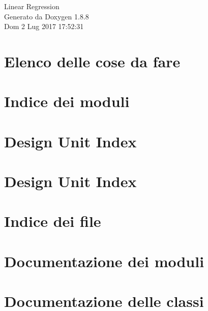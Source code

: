 \documentclass[twoside]{book}
\newcommand{\+}{\discretionary{\mbox{\scriptsize$\hookleftarrow$}}{}{}}
\newcommand{\clearemptydoublepage}{%
  \newpage{\pagestyle{empty}\cleardoublepage}%
}
\begin{document}
\hypersetup{pageanchor=false,
             bookmarks=true,
             bookmarksnumbered=true,
             pdfencoding=unicode
            }
\begin{titlepage}
\vspace*{7cm}
\begin{center}%
{\Large Linear Regression }\\
\vspace*{1cm}
{\large Generato da Doxygen 1.8.8}\\
\vspace*{0.5cm}
{\small Dom 2 Lug 2017 17:52:31}\\
\end{center}
\end{titlepage}
\clearemptydoublepage
\tableofcontents
\clearemptydoublepage
{}
\hypersetup{pageanchor=true}

\chapter{Elenco delle cose da fare}
\label{todo}
\hypertarget{todo}{}

\chapter{Indice dei moduli}

\chapter{Design Unit Index}

\chapter{Design Unit Index}

\chapter{Indice dei file}

\chapter{Documentazione dei moduli}





\chapter{Documentazione delle classi}


















\end{document}

